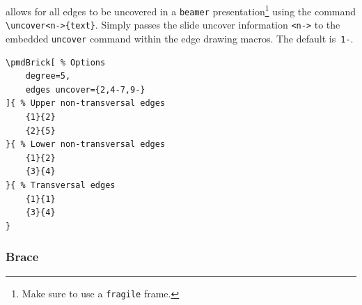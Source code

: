 \documentclass{ltxdoc}
\begin{document}
allows for all edges to be uncovered in a \texttt{beamer} presentation\footnote{Make sure to use a \texttt{fragile} frame.} using the command \verb`\uncover<n->{text}`. Simply passes the slide uncover information \verb`<n->` to the embedded \texttt{uncover} command within the edge drawing macros. The default is~\texttt{1-}.
\begin{center}
    \begin{minipage}{\dimexpr0.85\textwidth-2\fboxrule-2\fboxsep\relax}
        \begin{minipage}[c]{0.4\linewidth}
\begin{verbatim}
\pmdBrick[ % Options
    degree=5,
    edges uncover={2,4-7,9-}
]{ % Upper non-transversal edges
    {1}{2}
    {2}{5}
}{ % Lower non-transversal edges
    {1}{2}
    {3}{4}
}{ % Transversal edges
    {1}{1}
    {3}{4}
}
\end{verbatim}
        \end{minipage}
        \hfill
        \begin{minipage}[c]{0.4\linewidth}
        \end{minipage}
    \end{minipage}%
\end{center}

\subsubsection{Brace}
\end{document}
